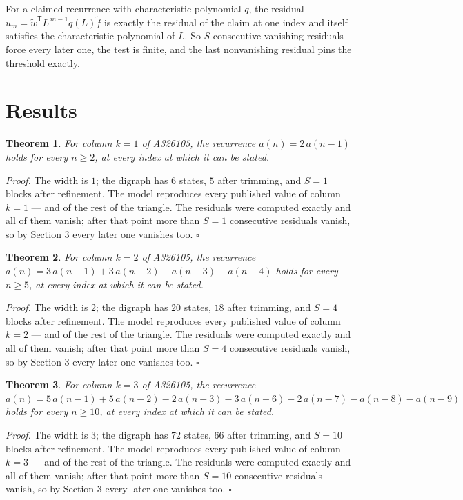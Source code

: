 \documentclass[11pt]{article}
\newtheorem{theorem}{Theorem}
\theoremstyle{definition}
\begin{document}
For a claimed recurrence with characteristic polynomial $q$, the residual $u_m = \tilde w^{\mathsf T}L^{\,m-1}q(L)\tilde f$ is exactly the residual of the claim at one index and itself satisfies the characteristic polynomial of $L$. So $S$ consecutive vanishing residuals force every later one, the test is finite, and the last nonvanishing residual pins the threshold exactly.

\section{Results}

\begin{theorem} For column $k = 1$ of A326105, the recurrence $a(n) = 2\,a(n-1)$ holds for every $n \ge 2$, at every index at which it can be stated.\end{theorem}

{\itshape Proof.} The width is $1$; the digraph has $6$ states, $5$ after trimming, and $S = 1$ blocks after refinement. The model reproduces every published value of column $k = 1$ --- and of the rest of the triangle. The residuals were computed exactly and all of them vanish; after that point more than $S = 1$ consecutive residuals vanish, so by Section 3 every later one vanishes too. $\square$

\begin{theorem} For column $k = 2$ of A326105, the recurrence $a(n) = 3\,a(n-1) + 3\,a(n-2) - a(n-3) - a(n-4)$ holds for every $n \ge 5$, at every index at which it can be stated.\end{theorem}

{\itshape Proof.} The width is $2$; the digraph has $20$ states, $18$ after trimming, and $S = 4$ blocks after refinement. The model reproduces every published value of column $k = 2$ --- and of the rest of the triangle. The residuals were computed exactly and all of them vanish; after that point more than $S = 4$ consecutive residuals vanish, so by Section 3 every later one vanishes too. $\square$

\begin{theorem} For column $k = 3$ of A326105, the recurrence $a(n) = 5\,a(n-1) + 5\,a(n-2) - 2\,a(n-3) - 3\,a(n-6) - 2\,a(n-7) - a(n-8) - a(n-9)$ holds for every $n \ge 10$, at every index at which it can be stated.\end{theorem}

{\itshape Proof.} The width is $3$; the digraph has $72$ states, $66$ after trimming, and $S = 10$ blocks after refinement. The model reproduces every published value of column $k = 3$ --- and of the rest of the triangle. The residuals were computed exactly and all of them vanish; after that point more than $S = 10$ consecutive residuals vanish, so by Section 3 every later one vanishes too. $\square$
\end{document}
